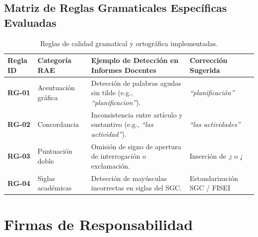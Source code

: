 \documentclass[12pt,a4paper]{article}
\begin{document}
\subsection{Matriz de Reglas Gramaticales Específicas Evaluadas}
\begin{table}[H]
\centering
\small
\renewcommand{\arraystretch}{1.2}
\begin{tabularx}{\textwidth}{|>{\hsize=0.5\hsize\centering\arraybackslash\bfseries\footnotesize}X|>{\hsize=0.9\hsize\raggedright\arraybackslash\footnotesize}X|>{\hsize=1.6\hsize\raggedright\arraybackslash\footnotesize}X|>{\hsize=1.0\hsize\centering\arraybackslash\footnotesize}X|}
\hline
\rowcolor{tableheader}
\textbf{Regla ID} & \textbf{Categoría RAE} & \textbf{Ejemplo de Detección en Informes Docentes} & \textbf{Corrección Sugerida} \\
\hline
RG-01 & Acentuación gráfica & Detección de palabras agudas sin tilde (e.g., \textit{``planificacion''}). & \textit{``planificación''} \\
\hline
RG-02 & Concordancia & Inconsistencia entre artículo y sustantivo (e.g., \textit{``las actividad''}). & \textit{``las actividades''} \\
\hline
RG-03 & Puntuación doble & Omisión de signo de apertura de interrogación o exclamación. & Inserción de \textit{¿} o \textit{¡} \\
\hline
RG-04 & Siglas académicas & Detección de mayúsculas incorrectas en siglas del SGC. & Estandarización SGC / FISEI \\
\hline
\end{tabularx}
\caption{Reglas de calidad gramatical y ortográfica implementadas.}
\end{table}

\section{Firmas de Responsabilidad}
\end{document}
